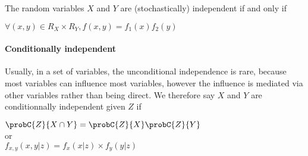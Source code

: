 The random variables $X$ and $Y$ are (stochastically) independent if and only if
\begin{center}
	$\forall (x,y)\in R_{X}\times R_{Y}, f(x,y)=f_{1}(x)f_{2}(y)$
\end{center}

\paragraph{Conditionally independent}
Usually, in a set of variables, the unconditional independence is rare, because most 
variables can influence most variables, however the influence is mediated via other 
variables rather than being direct. We therefore say $X$ and $Y$ are conditionnally
independent given $Z$ if
\begin{center}
	$\probC{Z}{X\cap Y} = \probC{Z}{X}\probC{Z}{Y}$\\
	or\\
	$f_{x,y}(x,y|z) = f_{x}(x|z)\times f_{y}(y|z)$
\end{center}
